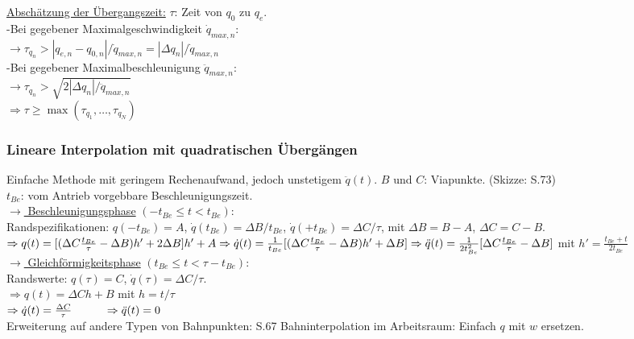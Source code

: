 \documentclass[a4paper,landscape,6pt]{article}
\newcommand{\ul}[1]{\underline{#1}}
\begin{document}
\begin{multicols}{3}
\ul{Abschätzung der Übergangszeit:} $\tau$: Zeit von $q_0$ zu $q_e$.\\
-Bei gegebener Maximalgeschwindigkeit $\dot q_{max,n}$:\\ $\rightarrow \tau_{q_n} > |q_{e,n} - q_{0,n}|/\dot q_{max,n} = |\Delta q_n|/\dot q_{max,n}$\\
-Bei gegebener Maximalbeschleunigung  $\ddot q_{max,n}$:\\
$\rightarrow \tau_{q_n} > \sqrt{2|\Delta q_n|/\ddot q_{max,n}}$\\

$\Rightarrow \tau \ge \max(\tau_{q_1}, \dots , \tau_{q_N})$
\subsubsection*{Lineare Interpolation mit quadratischen Übergängen}
Einfache Methode mit geringem Rechenaufwand, jedoch unstetigem $\ddot q(t)$. $B$ und $C$: Viapunkte. (Skizze: S.73)\\
$t_{Be}$: vom Antrieb vorgebbare Beschleunigungszeit.\\

\ul{$\rightarrow$ Beschleunigungsphase} $(-t_{Be} \le t < t_{Be}):$\\
Randspezifikationen: $q(-t_{Be}) = A$, $\dot q(t_{Be}) = \Delta B/t_{Be}$, $\dot q(+t_{Be}) = \Delta C / \tau$, mit $\Delta B = B - A$, $\Delta C = C - B$.\\

$\Rightarrow q(t) = [(\Delta C \frac{t_{Be}}{\tau} - \Delta B)h' + 2\Delta B]h' + A\\
 \Rightarrow \dot q(t) = \frac{1}{t_{Be}}[(\Delta C \frac{t_{Be}}{\tau} - \Delta B)h' + \Delta B]\\
 \Rightarrow \ddot q(t) = \frac{1}{2t_{Be}^2}[\Delta C \frac{t_{Be}}{\tau} - \Delta B]$ \tab mit $h' = \frac{t_{Be} + t}{2t_{Be}}$\\
 
 \ul{$\rightarrow$ Gleichförmigkeitsphase} $(t_{Be} \le t <\tau - t_{Be}):$\\
 Randswerte: $q(\tau) = C$, $\dot q(\tau) = \Delta C / \tau$.\\
 
 $\Rightarrow q(t) = \Delta C h + B$ \tab mit $h = t/\tau$ \\
 $\Rightarrow \dot q(t) = \frac{\Delta C}{\tau} \hspace*{1cm} \Rightarrow \ddot q(t) = 0$\\
 
 Erweiterung auf andere Typen von Bahnpunkten: S.67
 Bahninterpolation im Arbeitsraum: Einfach $q$ mit $w$ ersetzen.
 

\end{multicols}
\end{document}
